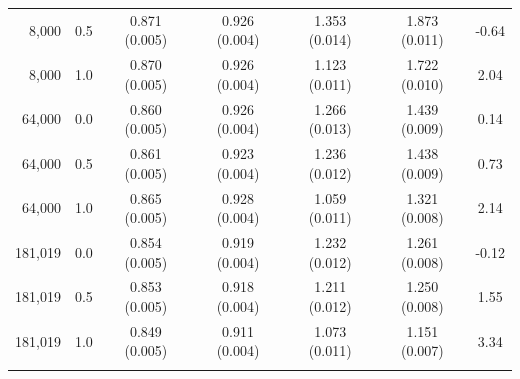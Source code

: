 \begin{tabular}{rrccccc}
8,000 & 0.5 & 0.871 (0.005) & 0.926 (0.004) & 1.353 (0.014) & 1.873 (0.011) & -0.64 \\
8,000 & 1.0 & 0.870 (0.005) & 0.926 (0.004) & 1.123 (0.011) & 1.722 (0.010) & 2.04 \\
64,000 & 0.0 & 0.860 (0.005) & 0.926 (0.004) & 1.266 (0.013) & 1.439 (0.009) & 0.14 \\
64,000 & 0.5 & 0.861 (0.005) & 0.923 (0.004) & 1.236 (0.012) & 1.438 (0.009) & 0.73 \\
64,000 & 1.0 & 0.865 (0.005) & 0.928 (0.004) & 1.059 (0.011) & 1.321 (0.008) & 2.14 \\
181,019 & 0.0 & 0.854 (0.005) & 0.919 (0.004) & 1.232 (0.012) & 1.261 (0.008) & -0.12 \\
181,019 & 0.5 & 0.853 (0.005) & 0.918 (0.004) & 1.211 (0.012) & 1.250 (0.008) & 1.55 \\
181,019 & 1.0 & 0.849 (0.005) & 0.911 (0.004) & 1.073 (0.011) & 1.151 (0.007) & 3.34 \\
\addlinespace
\bottomrule
\end{tabular}

